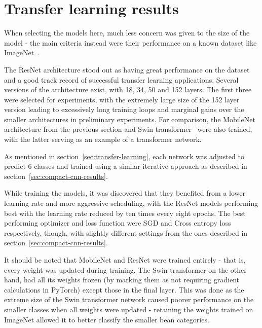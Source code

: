 \section{Transfer learning results}
\label{sec:transfer-learning-results}
When selecting the models here, much less concern was given to the size of the model - the main criteria instead were
their performance on a known dataset like ImageNet~\cite{imageNet}.

The ResNet architecture stood out as having great performance on the dataset and a good track record of successful
transfer learning applications.
Several versions of the architecture exist, with 18, 34, 50 and 152 layers.
The first three were selected for experiments, with the extremely large size of the 152 layer version leading to excessively long
training loops and marginal gains over the smaller architectures in preliminary experiments.
For comparison, the MobileNet architecture from the previous section and Swin transformer~\cite{swinTransformer} were also trained,
with the latter serving as an example of a transformer network.

As mentioned in section~\ref{sec:transfer-learning}, each network was adjusted to predict 6 classes and trained using a similar
iterative approach as described in section~\ref{sec:compact-cnn-results}.

While training the models, it was discovered that they benefited from a lower learning rate and more aggressive scheduling,
with the ResNet models performing best with the learning rate reduced by ten times every eight epochs.
The best performing optimizer and loss function were SGD and Cross entropy loss respectively, though, with slightly different settings
from the ones described in section~\ref{sec:compact-cnn-results}.

It should be noted that MobileNet and ResNet were trained entirely - that is, every weight was updated during training.
The Swin transformer on the other hand, had all its weights frozen (by marking them as not requiring gradient calculations in PyTorch)
except those in the final layer.
This was done as the extreme size of the Swin transformer network caused poorer performance on the smaller classes when all weights were updated -
retaining the weights trained on ImageNet allowed it to better classify the smaller bean categories.

